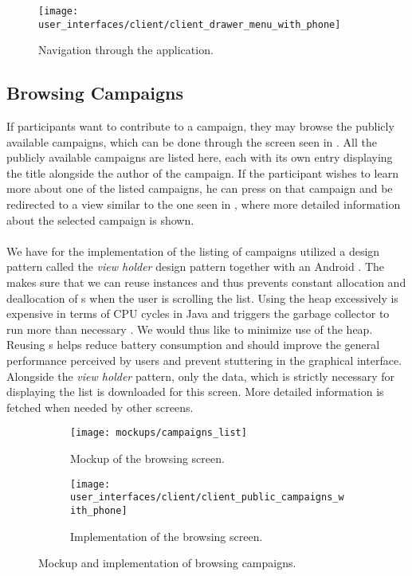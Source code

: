 \begin{figure}[!htbp]
    \centering
    \texttt{[image: user\_interfaces/client/client\_drawer\_menu\_with\_phone]}
    \caption{Navigation through the application.}
    \label{fig:navigation}
\end{figure}
\FloatBarrier

\subsection{Browsing Campaigns}
\label{sub:browsing_campaigns}



 If participants want to contribute to a campaign, they may browse the publicly available campaigns, which can be done through the screen seen in . All the publicly available campaigns are listed here, each with its own entry displaying the title alongside the author of the campaign. If the participant wishes to learn more about one of the listed campaigns, he can press on that campaign and be redirected to a view similar to the one seen in , where more detailed information about the selected campaign is shown. 
\\\\
We have for the implementation of the listing of campaigns utilized a design pattern called the \emph{view holder} design pattern \parencite{view_holder_pattern} together with an Android . The  makes sure that we can reuse  instances and thus prevents constant allocation and deallocation of s when the user is scrolling the list. Using the heap excessively is expensive in terms of CPU cycles in Java and triggers the garbage collector to run more than necessary \parencite{android_garbage_collection}. We would thus like to minimize use of the heap. Reusing s helps reduce battery consumption and should improve the general performance perceived by users and prevent stuttering in the graphical interface. Alongside the \emph{view holder} pattern, only the data, which is strictly necessary for displaying the list is downloaded for this screen. More detailed information is fetched when needed by other screens.

\begin{figure}[!htbp]
    \begin{subfigure}[!t]{.48\textwidth}
        \centering
        \texttt{[image: mockups/campaigns\_list]}
        \caption{Mockup of the browsing screen.}
        \label{fig:mockup_public_campaigns}
    \end{subfigure}%
    \begin{subfigure}[!t]{.52\textwidth}
        \centering
        \texttt{[image: user\_interfaces/client/client\_public\_campaigns\_with\_phone]}
        \caption{Implementation of the browsing screen.}
        \label{fig:implementation_public_campaigns}
    \end{subfigure}
    \caption{Mockup and implementation of browsing campaigns.}
    \label{fig:public_campaigns}
\end{figure}
\FloatBarrier

